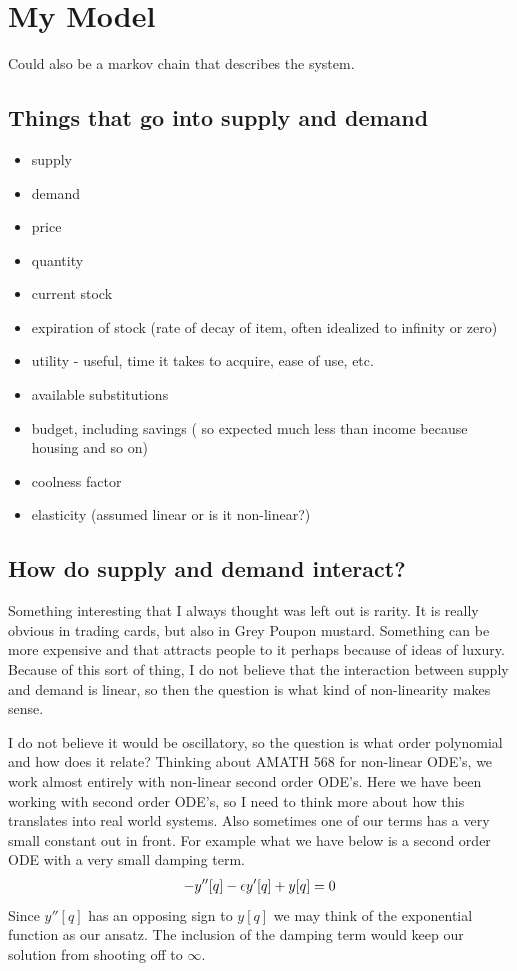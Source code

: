 \documentclass{article}
\begin{document}
\section{My Model}
Could also be a markov chain that describes the system.

\subsection{Things that go into supply and demand}
\begin{itemize}
	\item supply
	\item demand
	\item price
	\item quantity
	\item current stock
	\item expiration of stock (rate of decay of item, often idealized to infinity or zero)
	\item utility - useful, time it takes to acquire, ease of use, etc.
	\item available substitutions
	\item budget, including savings ( so expected much less than income because housing and so on)
	\item coolness factor
	\item elasticity (assumed linear or is it non-linear?)
\end{itemize}

\subsection{How do supply and demand interact?}
Something interesting that I always thought was left out is rarity. It is really obvious in trading cards, but also in Grey Poupon mustard. Something can be more expensive and that attracts people to it perhaps because of ideas of luxury. Because of this sort of thing, I do not believe that the interaction between supply and demand is linear, so then the question is what kind of non-linearity makes sense. 

I do not believe it would be oscillatory, so the question is what order polynomial and how does it relate? 
Thinking about AMATH 568 for non-linear ODE's, we work almost entirely with non-linear second order ODE's. Here we have been working with second order ODE's, so I need to think more about how this translates into real world systems. Also sometimes one of our terms has a very small constant out in front. For example what we have below is a second order ODE with a very small damping term. 
\begin{align*}
	-y''[q] - \epsilon y'[q] +y[q] = 0
\end{align*}
Since $y''[q]$ has an opposing sign to $y[q]$ we may think of the exponential function as our ansatz. The inclusion of the damping term would keep our solution from shooting off to $\infty$. 
\end{document}
